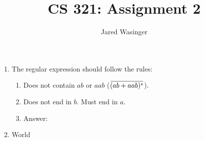 \documentclass{article}
\newcommand{\overbar}[1]{\mkern 1.5mu\overline{\mkern-1.5mu#1\mkern-1.5mu}\mkern 1.5mu}
\begin{document}
  \title{CS 321: Assignment 2}
  \author{Jared Wasinger}

  \maketitle

  \begin{enumerate}
		\item The regular expression should follow the rules:\begin{enumerate}
			\item Does not contain $ab$ or $aab$ ($\overbar{(ab+aab)^*}$).
			\item Does not end in $b$. Must end in $a$.
			\item Answer: 
			\end{enumerate}
		\item World
	\end{enumerate}
\end{document}

